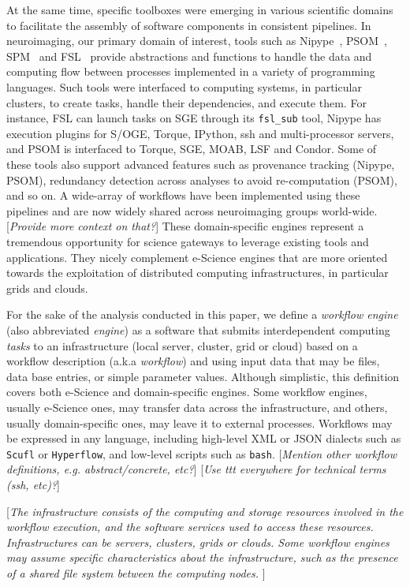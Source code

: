 \documentclass[preprint,3p,twocolumn]{elsarticle}
\newcommand{\todo}[1]{\color{blue}\xspace[\emph{#1}]\xspace\color{black}}
\begin{document}
At the same time, specific toolboxes were emerging in various
scientific domains to facilitate the assembly of software components
in consistent pipelines. In neuroimaging, our primary domain of
interest, tools such as Nipype~\cite{gorgolewski2011nipype},
PSOM~\cite{bellec2012pipeline}, SPM~\cite{ashburner2011spm} and
FSL~\cite{Jenkinson2012782} provide abstractions and functions to
handle the data and computing flow between processes implemented in a
variety of programming languages. Such tools were interfaced to
computing systems, in particular clusters, to create tasks, handle
their dependencies, and execute them. For instance, FSL can launch
tasks on SGE through its \texttt{fsl\_sub} tool, Nipype has execution
plugins for S/OGE, Torque, IPython, ssh and multi-processor servers,
and PSOM is interfaced to Torque, SGE, MOAB, LSF and Condor. Some of
these tools also support advanced features such as provenance tracking
(Nipype, PSOM), redundancy detection across analyses to avoid
re-computation (PSOM), and so on. A wide-array of workflows have been
implemented using these pipelines and are now widely shared across
neuroimaging groups world-wide. \todo{Provide more context on that?}
These domain-specific engines represent a tremendous opportunity for
science gateways to leverage existing tools and applications. They
nicely complement e-Science engines that are more oriented towards the
exploitation of distributed computing infrastructures, in particular
grids and clouds.

For the sake of the analysis conducted in this paper, we
define a \emph{workflow engine} (also abbreviated \emph{engine}) as a
software that submits interdependent computing \emph{tasks} to an
infrastructure (local server, cluster, grid or cloud) based on a
workflow description (a.k.a \emph{workflow}) and using input data that
may be files, data base entries, or simple parameter values. Although
simplistic, this definition covers both e-Science and domain-specific
engines. Some workflow engines, usually e-Science ones, may transfer
data across the infrastructure, and others, usually domain-specific
ones, may leave it to external processes. Workflows may be expressed
in any language, including high-level XML or JSON dialects such as
\texttt{Scufl} or \texttt{Hyperflow}, and low-level scripts such as
\texttt{bash}.  \todo{Mention other workflow definitions,
  e.g. abstract/concrete, etc?} \todo{Use ttt everywhere for technical
  terms (ssh, etc)?}

\todo{The infrastructure consists of the computing and storage resources
involved in the workflow execution, and the software services used to
access these resources. Infrastructures can be servers, clusters,
grids or clouds. Some workflow engines may assume specific
characteristics about the infrastructure, such as the presence of a
shared file system between the computing nodes.
}
\end{document}
